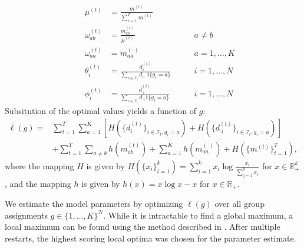 \documentclass{article}
\begin{document}
\begin{align*}
& &\mu^{(t)} &= \frac{m_{\cdot\cdot}^{(t)}}{\sum_{\tau=1}^T m_{\cdot\cdot}^{(t)}} & \\
& & \omega_{ab}^{(t)} & = \frac{m_{ab}^{(t)}}{\mu^{(t)}} & \qquad a\neq b \\
& & \omega_{aa}^{(t)} &= m_{aa}^{(\cdot)} & \qquad a=1,\ldots,K \\
& & \theta_i^{(t)} &= \frac{ d_{i\cdot}^{(t)} }{ \sum_{i\in \mathcal{I}_t} d_{i\cdot} 1\{g_i = a\} } & \qquad i=1,\ldots,N \\
& & \phi_i^{(t)} &= \frac{ d_{\cdot i}^{(t)}}{\sum_{i \in \mathcal{I}_t} d_{\cdot i} 1\{g_i=a\} } & \qquad i=1,\ldots,N
\end{align*}
Subsitution of the optimal values yields a function of $g$:
\begin{align} 
\nonumber \ell(g) =& \sum_{t=1}^T \sum_{a=1}^K \left[ H\left(\{d_{i\cdot}^{(t)}\}_{i \in \mathcal{I}_t, g_i=a}\right) + H\left(\{d_{\cdot i}^{(t)}\}_{i \in \mathcal{I}_t, g_i=a}\right) \right] \\
& + \sum_{t=1}^T \sum_{a\neq b} h(m_{ab}^{(t)}) + \sum_{a=1}^K h( m_{aa}^{(\cdot )}) + H\left(\{m_{\cdot \cdot}^{(t)}\}_{t=1}^T\right), \label{eq:model}
\end{align}
where the mapping $H$ is given by $H(\{x_i\}_{i=1}^k) = \sum_{i=1}^k x_i \log \frac{x_i}{\sum_{j=1}^k x_j}$ for $x \in \mathbb{R}_+^k$, and the mapping $h$ is given by $h(x) = x \log x - x$ for $x \in \mathbb{R}_+$.

We estimate the model parameters by optimizing $\ell(g)$ over all group assignments $g \in \{1,\ldots,K\}^N$. While it is intractable to find a global maximum, a local maximum can be found using the method described in \cite{karrer2011stochastic}. After multiple restarts, the highest scoring local optima was chosen for the parameter estimate.

\end{document}
